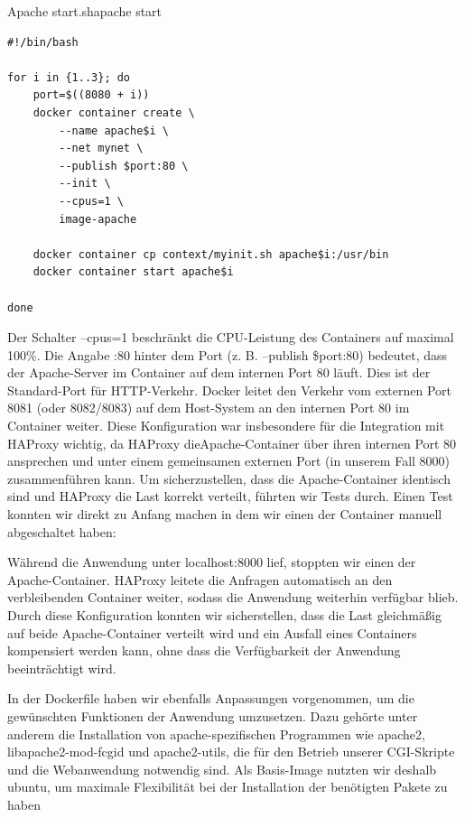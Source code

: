 \begin{code}{Apache start.sh}{apache start}
        \begin{verbatim}
#!/bin/bash

for i in {1..3}; do
    port=$((8080 + i))
    docker container create \
        --name apache$i \
        --net mynet \
        --publish $port:80 \
        --init \
        --cpus=1 \
        image-apache

    docker container cp context/myinit.sh apache$i:/usr/bin
    docker container start apache$i

done

  \end{verbatim}
\end{code}


Der Schalter --cpus=1 beschränkt die CPU-Leistung des Containers auf maximal 100\%. Die Angabe :80 hinter dem Port (z. B. --publish \$port:80) bedeutet, dass der Apache-Server im Container auf dem internen Port 80 läuft. Dies ist der Standard-Port für HTTP-Verkehr. Docker leitet den Verkehr vom externen Port 8081 (oder 8082/8083) auf dem Host-System an den internen Port 80 im Container weiter. Diese Konfiguration war insbesondere für die Integration mit HAProxy wichtig, da HAProxy dieApache-Container über ihren internen Port 80 ansprechen und unter einem gemeinsamen externen Port (in unserem Fall 8000) zusammenführen kann. Um sicherzustellen, dass die Apache-Container identisch sind und HAProxy die Last korrekt verteilt, führten wir Tests durch. Einen Test konnten wir direkt zu Anfang machen in dem wir einen der Container manuell abgeschaltet haben:

 Während die Anwendung unter localhost:8000 lief, stoppten wir einen der Apache-Container. HAProxy leitete die Anfragen automatisch an den verbleibenden Container weiter, sodass die Anwendung weiterhin verfügbar blieb. Durch diese Konfiguration konnten wir sicherstellen, dass die Last gleichmäßig auf beide Apache-Container verteilt wird und ein Ausfall eines Containers kompensiert werden kann, ohne dass die Verfügbarkeit der Anwendung beeinträchtigt wird.



In der Dockerfile haben wir ebenfalls Anpassungen vorgenommen, um die gewünschten Funktionen der Anwendung umzusetzen. Dazu gehörte unter anderem die Installation von apache-spezifischen Programmen wie apache2, libapache2-mod-fcgid und apache2-utils, die für den Betrieb unserer CGI-Skripte und die Webanwendung notwendig sind. Als Basis-Image nutzten wir deshalb ubuntu, um maximale Flexibilität bei der Installation der benötigten Pakete zu haben

